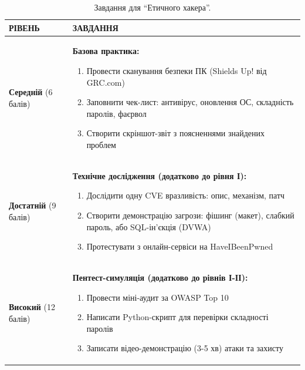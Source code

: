 \begin{table}[h!]
\caption{Завдання для ``Етичного хакера''.}
\label{tab:lab1_tech_task} %
\noindent %

\begin{tabular}{
  | >{\raggedright\arraybackslash}p{} 
  | >{\raggedright\arraybackslash}p{} |
}
\hline

\rowcolor{TableHeaderBlue}
\hfil\color{white}\textbf{РІВЕНЬ} & 
\hfil\color{white}\textbf{ЗАВДАННЯ} \\ \hline

\cellcolor{TableBodyGreen}
\textbf{Середній} (6 балів) &
\textbf{Базова практика:}
\begin{enumerate}
    \item Провести сканування безпеки ПК (Shields Up! від GRC.com)
    \item Заповнити чек-лист: антивірус, оновлення ОС, складність паролів, фаєрвол
    \item Створити скріншот-звіт з поясненнями знайдених проблем
\end{enumerate} \\ \hline

\cellcolor{TableBodyGreen}
\textbf{Достатній} (9 балів) &
\textbf{Технічне дослідження (додатково до рівня І):}
\begin{enumerate}
    \item Дослідити одну CVE вразливість: опис, механізм, патч
    \item Створити демонстрацію загрози: фішинг (макет), слабкий пароль, або SQL-ін’єкція (DVWA)
    \item Протестувати з онлайн-сервіси на HaveIBeenPwned
\end{enumerate} \\ \hline

\cellcolor{TableBodyGreen}
\textbf{Високий} (12 балів) &
\textbf{Пентест-симуляція (додатково до рівнів І-ІІ):}
\begin{enumerate}
    \item Провести міні-аудит за OWASP Top 10
    \item Написати Python-скрипт для перевірки складності паролів
    \item Записати відео-демонстрацію (3-5 хв) атаки та захисту
\end{enumerate} \\ \hline

\end{tabular}
\end{table}


